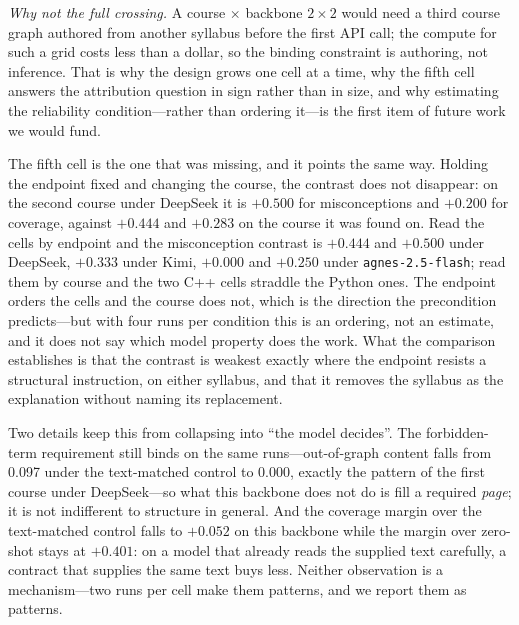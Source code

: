 \documentclass[review,12pt]{elsarticle}
\renewcommand{\_}{\kgunderscore\allowbreak}
\newcommand{\id}[1]{\texttt{#1}}
\begin{document}
\emph{Why not the full crossing.} A course $\times$ backbone $2\times2$ would
need a third course graph authored from another syllabus before the first API
call; the compute for such a grid costs less than a dollar, so the binding
constraint is authoring, not inference. That is why the design grows one cell at
a time, why the fifth cell answers the attribution question in sign rather than
in size, and why estimating the reliability condition---rather than ordering
it---is the first item of future work we would fund.

The fifth cell is the one that was missing, and it points the same way.
Holding the endpoint fixed and changing the course, the contrast does not
disappear: on the second course under DeepSeek it is $+0.500$ for
misconceptions and $+0.200$ for coverage, against $+0.444$ and $+0.283$ on the
course it was found on. Read the cells by endpoint and the misconception
contrast is $+0.444$ and $+0.500$ under DeepSeek, $+0.333$ under Kimi, $+0.000$
and $+0.250$ under \id{agnes-2.5-flash}; read them by course and the two C++
cells straddle the Python ones. The endpoint orders the cells and the course
does not, which is the direction the precondition predicts---but with four runs
per condition this is an ordering, not an estimate, and it does not say which
model property does the work. What the comparison establishes is that the
contrast is weakest exactly where the endpoint resists a structural
instruction, on either syllabus, and that it removes the syllabus as the
explanation without naming its replacement.

\begin{table}[t]
\caption{The same two paired contrasts on every (backbone, course) cell we have.
Rows 1--3 hold course, graph, prompts, validator and metric code fixed and vary
only the endpoint; rows 4 and 5 hold the endpoint fixed and vary the course (row~4
against row~1, row~5 against row~3). $\Delta$ is \id{full} minus \id{rag\_mc}; the
last column is the distribution the reliability claim is about. Two resamplings
per cell, four runs per condition. Generated by \id{paper/tables.py -{}-sweep}.}
\label{tab:sweep}
\centering
\small

\end{table}

Two details keep this from collapsing into ``the model decides''. The
forbidden-term requirement still binds on the same runs---out-of-graph content
falls from 0.097 under the text-matched control to 0.000, exactly the pattern
of the first course under DeepSeek---so what this backbone does not do is fill
a required \emph{page}; it is not indifferent to structure in general. And the
coverage margin over the text-matched control falls to $+0.052$ on this
backbone while the margin over zero-shot stays at $+0.401$: on a model that
already reads the supplied text carefully, a contract that supplies the same
text buys less. Neither observation is a mechanism---two runs per cell make
them patterns, and we report them as patterns.
\end{document}
